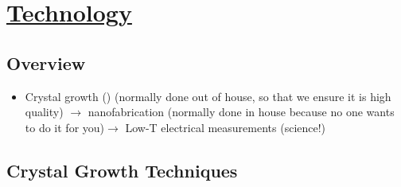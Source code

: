 
\section[Technology]{\hyperlink{toc}{Technology}}

\subsection{Overview}

\begin{itemize}
    \item Crystal growth () (normally done out of house, so that we ensure it is high quality) $\rightarrow$ nanofabrication (normally done in house because no one wants to do it for you)$\rightarrow$ Low-T electrical measurements (science!)
\end{itemize}

\subsection{Crystal Growth Techniques}


